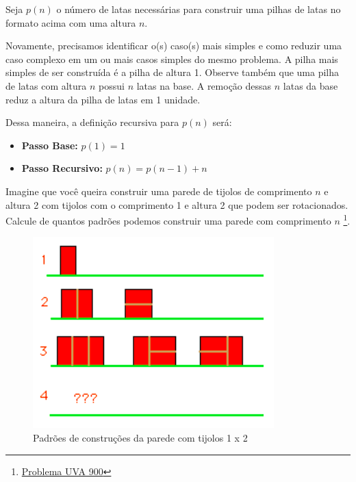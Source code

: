 Seja $p(n)$ o número de latas necessárias para construir uma pilhas de latas no formato acima com uma altura $n$. 

Novamente, precisamos identificar o(s) caso(s) mais simples e como reduzir uma caso complexo em um ou mais casos simples do mesmo problema. A pilha mais simples de ser construída é a pilha de altura 1. Observe também que uma pilha de latas com altura $n$ possui $n$ latas na base. A remoção dessas $n$ latas da base reduz a altura da pilha de latas em 1 unidade.  

Dessa maneira, a definição recursiva para $p(n)$ será:

\begin{itemize}
    \item \textbf{Passo Base:} $p(1) = 1$
    \item \textbf{Passo Recursivo:} $p(n) = p(n-1) + n$
\end{itemize}


\begin{exemplo}
Imagine que você queira construir uma parede de tijolos de comprimento $n$ e altura 2 com tijolos com o comprimento 1 e altura 2 que podem ser rotacionados. Calcule de quantos padrões podemos construir uma parede com comprimento $n$ \footnote{\href{https://onlinejudge.org/index.php?option=com_onlinejudge&Itemid=8&page=show_problem&problem=841}{Problema UVA 900}}.

\begin{figure}[!htbp]
\label{fig::tijolos}
\begin{center}
\includegraphics[scale=0.7]{images/pattern.png} 
\end{center}
\caption{Padrões de construções da parede com tijolos 1 x 2}

\end{figure}

\end{exemplo}


